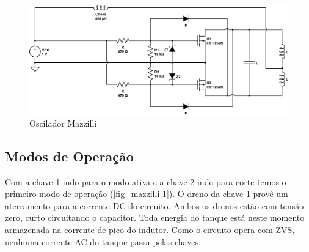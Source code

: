 \begin{figure}[h]
\caption{\label{fig_mazzilli}Oscilador Mazzilli}
\begin{center}
\includegraphics[scale=0.5]{images/mazzilli.png}
\end{center}
\end{figure}

\subsection{Modos de Operação}

Com a chave 1 indo para o modo ativa e a chave 2 indo para corte temos o primeiro modo de operação (\autoref{fig_mazzilli-1}). O dreno da chave 1 provê um aterramento para a corrente DC do circuito. Ambos os drenos estão com tensão zero, curto circuitando o capacitor. Toda energia do tanque está neste momento armazenada na corrente de pico do indutor. Como o circuito opera com ZVS, nenhuma corrente AC do tanque passa pelas chaves. 

